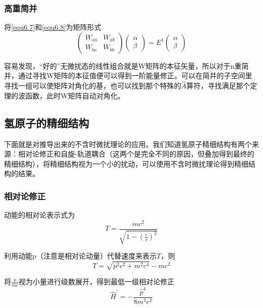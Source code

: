 \documentclass[UTF8]{ctexart}
\begin{document}
    \subsubsection{高重简并}
    将\autoref{equ6.7}和\autoref{equ6.8}为矩阵形式
    \begin{equation}
        \begin{pmatrix}
            W_{aa} & W_{ab} \\
            W_{ba} & W_{bb}
        \end{pmatrix}
        \begin{pmatrix}
            \alpha \\
            \beta 
        \end{pmatrix}
        = E^1
        \begin{pmatrix}
            \alpha \\
            \beta 
        \end{pmatrix}
    \end{equation}

\noindent 容易发现，“好的”无微扰态的线性组合就是W矩阵的本征矢量，所以对于n重简并，通过寻找W矩阵的本征值便可以得到一阶能量修正。可以在简并的子空间里寻找一组可以使矩阵对角化的基，也可以找到那个特殊的$\hat{A}$算符，寻找满足那个定理的波函数，此时W矩阵自动对角化。

    \subsection{氢原子的精细结构}
    下面就是对推导出来的不含时微扰理论的应用。我们知道氢原子精细结构有两个来源：相对论修正和自旋-轨道耦合（这两个是完全不同的原因，但叠加得到最终的精细结构），将精细结构视为一个小的扰动，可以使用不含时微扰理论得到精细结构的结果。

    \subsubsection{相对论修正}
    动能的相对论表示式为
    \begin{equation}
        T = \frac{mc^2}{\sqrt{1-\left(\frac{v}{c}\right)^2}}
    \end{equation}

\noindent 利用动能p（注意是相对论动量）代替速度来表示$T$，则
\begin{equation}
    T = \sqrt{p^2 c^2 + m^2 c^4} - mc^2
\end{equation}

    将$\frac{p}{mc}$视为小量进行级数展开，得到最低一级相对论修正
    \begin{equation}
        \hat{H}^{\prime} = - \frac{\hat{p}^4}{8 m^3 c^2}
    \end{equation}
\end{document}
